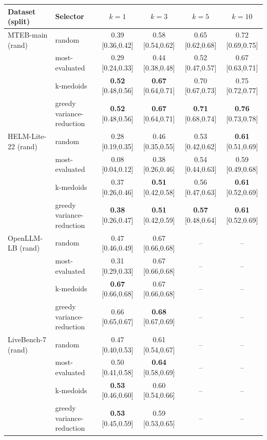 \begin{tabular}{llcccc}\toprule
Dataset (split) & Selector & $k{=}1$ & $k{=}3$ & $k{=}5$ & $k{=}10$ \\\midrule
MTEB-main (rand) & random & 0.39 \scriptsize[0.36,0.42] & 0.58 \scriptsize[0.54,0.62] & 0.65 \scriptsize[0.62,0.68] & 0.72 \scriptsize[0.69,0.75] \\
 & most-evaluated & 0.29 \scriptsize[0.24,0.33] & 0.44 \scriptsize[0.38,0.48] & 0.52 \scriptsize[0.47,0.57] & 0.67 \scriptsize[0.63,0.71] \\
 & k-medoids & \textbf{0.52} \scriptsize[0.48,0.56] & \textbf{0.67} \scriptsize[0.64,0.71] & 0.70 \scriptsize[0.67,0.73] & 0.75 \scriptsize[0.72,0.77] \\
 & greedy variance-reduction & \textbf{0.52} \scriptsize[0.48,0.56] & \textbf{0.67} \scriptsize[0.64,0.71] & \textbf{0.71} \scriptsize[0.68,0.74] & \textbf{0.76} \scriptsize[0.73,0.78] \\
\midrule
HELM-Lite-22 (rand) & random & 0.28 \scriptsize[0.19,0.35] & 0.46 \scriptsize[0.35,0.55] & 0.53 \scriptsize[0.42,0.62] & \textbf{0.61} \scriptsize[0.51,0.69] \\
 & most-evaluated & 0.08 \scriptsize[0.04,0.12] & 0.38 \scriptsize[0.26,0.46] & 0.54 \scriptsize[0.44,0.63] & 0.59 \scriptsize[0.49,0.68] \\
 & k-medoids & 0.37 \scriptsize[0.26,0.46] & \textbf{0.51} \scriptsize[0.42,0.58] & 0.56 \scriptsize[0.47,0.63] & \textbf{0.61} \scriptsize[0.52,0.69] \\
 & greedy variance-reduction & \textbf{0.38} \scriptsize[0.26,0.47] & \textbf{0.51} \scriptsize[0.42,0.59] & \textbf{0.57} \scriptsize[0.48,0.64] & \textbf{0.61} \scriptsize[0.52,0.69] \\
\midrule
OpenLLM-LB (rand) & random & 0.47 \scriptsize[0.46,0.49] & 0.67 \scriptsize[0.66,0.68] & -- & -- \\
 & most-evaluated & 0.31 \scriptsize[0.29,0.33] & 0.67 \scriptsize[0.66,0.68] & -- & -- \\
 & k-medoids & \textbf{0.67} \scriptsize[0.66,0.68] & 0.67 \scriptsize[0.66,0.68] & -- & -- \\
 & greedy variance-reduction & 0.66 \scriptsize[0.65,0.67] & \textbf{0.68} \scriptsize[0.67,0.69] & -- & -- \\
\midrule
LiveBench-7 (rand) & random & 0.47 \scriptsize[0.40,0.53] & 0.61 \scriptsize[0.54,0.67] & -- & -- \\
 & most-evaluated & 0.50 \scriptsize[0.41,0.58] & \textbf{0.64} \scriptsize[0.58,0.69] & -- & -- \\
 & k-medoids & \textbf{0.53} \scriptsize[0.46,0.60] & 0.60 \scriptsize[0.54,0.66] & -- & -- \\
 & greedy variance-reduction & \textbf{0.53} \scriptsize[0.45,0.59] & 0.59 \scriptsize[0.53,0.65] & -- & -- \\
\bottomrule
\end{tabular}
